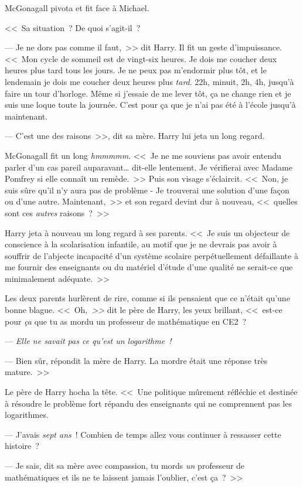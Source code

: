 McGonagall pivota et fit face à Michael.

<<~Sa situation~? De quoi s'agit-il~?

--- Je ne dors pas comme il faut,~>> dit Harry. Il fit un geste d'impuissance. <<~Mon cycle de sommeil est de vingt-six heures. Je dois me coucher deux heures plus tard tous les jours. Je ne peux pas m'endormir plus tôt, et le lendemain je dois me coucher deux heures plus \emph{tard}. 22h, minuit, 2h, 4h, jusqu'à faire un tour d'horloge. Même si j'essaie de me lever tôt, ça ne change rien et je suis une loque toute la journée. C'est pour ça que je n'ai pas été à l'école jusqu'à maintenant.

--- C'est une des raisons~>>, dit sa mère. Harry lui jeta un long regard.

McGonagall fit un long \emph{hmmmmm}. <<~Je ne me souviens pas avoir entendu parler d'un cas pareil auparavant… dit-elle lentement. Je vérifierai avec Madame Pomfrey si elle connaît un remède.~>> Puis son visage s'éclaircit. <<~Non, je suis sûre qu'il n'y aura pas de problème - Je trouverai une solution d'une façon ou d'une autre. Maintenant,~>> et son regard devint dur à nouveau, <<~quelles sont ces \emph{autres} raisons~?~>>

Harry jeta à nouveau un long regard à ses parents. <<~Je suis un objecteur de conscience à la scolarisation infantile, au motif que je ne devrais pas avoir à souffrir de l'abjecte incapacité d'un système scolaire perpétuellement défaillante à me fournir des enseignants ou du matériel d'étude d'une qualité ne serait-ce que minimalement adéquate.~>>

Les deux parents hurlèrent de rire, comme si ils pensaient que ce n'était qu'une bonne blague. <<~Oh,\emph{~>>} dit le père de Harry, les yeux brillant, <<~est-ce pour \emph{ça} que tu as mordu un professeur de mathématique en CE2~?

--- \emph{Elle ne savait pas ce qu'est un logarithme~!}

--- Bien sûr, répondit la mère de Harry. La mordre était une réponse très mature.~>>

Le père de Harry hocha la tête. <<~Une politique mûrement réfléchie et destinée à résoudre le problème fort répandu des enseignants qui ne comprennent pas les logarithmes.

--- J'avais \emph{sept ans}~! Combien de temps allez vous continuer à ressasser cette histoire~?

--- Je sais, dit sa mère avec compassion, tu mords \emph{un} professeur de mathématiques et ils ne te laissent jamais l'oublier, c'est ça~?~>>

